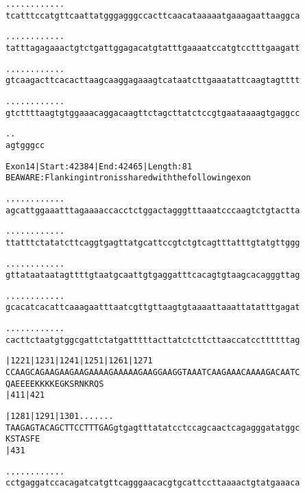 \documentclass{article}
\begin{document}
\newpage
\begin{alltt}
  .    .    .    .    .    .    .    .    .    .    .    .
tcatttccatgttcaattatgggagggccacttcaacataaaaatgaaagaattaaggca



  .    .    .    .    .    .    .    .    .    .    .    .
tatttagagaaactgtctgattggagacatgtatttgaaaatccatgtcctttgaagatt



  .    .    .    .    .    .    .    .    .    .    .    .
gtcaagacttcacacttaagcaaggagaaagtcataatcttgaaatattcaagtagtttt



  .    .    .    .    .    .    .    .    .    .    .    .
gtcttttaagtgtggaaacaggacaagttctagcttatctccgtgaataaaagtgaggcc



  .    .
agtgggcc


\end{alltt}
\newpage
\begin{alltt}
Exon 14 | Start: 42384 | End: 42465 | Length: 81
BE AWARE: Flanking intron is shared with the following exon

.    .    .    .    .    .    .    .    .    .    .    .
agcattggaaatttagaaaaccacctctggactagggtttaaatcccaagtctgtactta



.    .    .    .    .    .    .    .    .    .    .    .
ttatttctatatcttcaggtgagttatgcattccgtctgtcagtttatttgtatgttggg



.    .    .    .    .    .    .    .    .    .    .    .
gttataataatagttttgtaatgcaattgtgaggatttcacagtgtaagcacagggttag



.    .    .    .    .    .    .    .    .    .    .    .
gcacatcacattcaaagaatttaatcgttgttaagtgtaaaattaaattatatttgagat



.    .    .    .    .    .    .    .    .    .    .    .
cacttctaatgtggcgattctatgatttttacttatctcttcttaaccatccttttttag



|1221     |1231     |1241     |1251     |1261     |1271
CCAAGCAGAAGAAGAAGAAAAGAAAAAGAAGGAAGGTAAATCAAGAAACAAAAGACAATC
 Q  A  E  E  E  E  K  K  K  K  E  G  K  S  R  N  K  R  Q  S
          |411                          |421

|1281     |1291     |1301 .    .    .    .    .    .    .
TAAGAGTACAGCTTCCTTTGAGgtgagtttatatcctccagcaactcagagggatatggc
 K  S  T  A  S  F  E
          |431

 .    .    .    .    .    .    .    .    .    .    .    .
cctgaggatccacagatcatgttcagggaacacgtgcattccttaaaactgtatgaaaca



\end{alltt}
\end{document}
